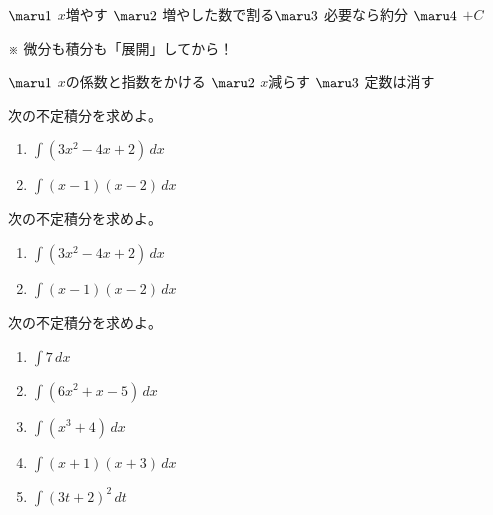 \begin{multicols*}{4}
 \begin{thmBlock}
   $\maru1$ $x$増やす $\maru2$ 増やした数で割る$\maru3$ 必要なら約分 $\maru4$ $+C$
  
  \hfill{}※ 微分も積分も「展開」してから！
  
   $\maru1$ $x$の係数と指数をかける $\maru2$ $x$減らす $\maru3$ 定数は消す
 \end{thmBlock}
 
 \columnbreak{}
 
 次の不定積分を求めよ。
 
 \begin{enumerate}
  \item $\displaystyle\int (3x^2-4x+2)\,dx$
	\vfill
  \item $\displaystyle\int (x-1)(x-2)\,dx$
	\vfill
 \end{enumerate}
 
 \vspace{1\zw}
 
 次の不定積分を求めよ。
 
 \begin{enumerate}
  \item $\displaystyle\int (3x^2-4x+2)\,dx$
	\begin{ansBlockSize}{15}
	\end{ansBlockSize}
  \item $\displaystyle\int (x-1)(x-2)\,dx$
	\begin{ansBlockSize}{18}
	\end{ansBlockSize}
 \end{enumerate}
 
 \columnbreak{}
 
 次の不定積分を求めよ。
 
 \begin{enumerate}
  \item $\displaystyle\int 7\,dx$
	\begin{ansBlockSize}{10}
	\end{ansBlockSize}
  \item $\displaystyle\int (6x^2+x-5)\,dx$
	\begin{ansBlockSize}{10}
	\end{ansBlockSize}
  \item $\displaystyle\int (x^3+4)\,dx$
	\begin{ansBlockSize}{10}
	\end{ansBlockSize}
  \item $\displaystyle\int (x+1)(x+3)\,dx$
	\begin{ansBlockSize}{15}
	\end{ansBlockSize}
  \item $\displaystyle\int (3t+2)^2\,dt$
	\begin{ansBlockSize}{15}
	\end{ansBlockSize}
 \end{enumerate}
 

\end{multicols*}
